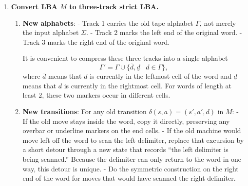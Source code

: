 \begin{enumerate}[{11.}1. ]
On input $x$ of length $n$, tape 1 holds $x$ and is never altered. Tape 2 starts
with just the start symbol $Z$. The finite control nondeterministically chooses
a production from $P$ and a position in the current sentential form on tape 2,
checks whether the left side of that production occurs at that position, and if
so replaces that occurrence by the right side by shifting the surrounding tape
contents as needed.

The only extra observation needed for a type~1 grammar is that, once the machine
has begun deriving a nonempty word, the length of the sentential form can never
decrease. Therefore any branch on which tape 2 ever becomes longer than $n$ can
be abandoned immediately, because it can never later shrink back to the target
word $x$. Thus every surviving computation keeps tape 2 within $n$ cells.

If $x=\lambda$, the only successful derivation is the special initial production
$Z\to\lambda$. If $x\neq\lambda$, the machine accepts exactly when some sequence
of guessed productions makes tape 2 agree with tape 1. Thus this two-tape
construction is bounded by a linear amount of tape, and hence is a
nondeterministic LBA.
Therefore every type~1 language is a LBL. \qed

\item \textbf{Convert LBA $M$ to three-track strict LBA.}

\begin{enumerate}
\item \textbf{New alphabets}:
- Track 1 carries the old tape alphabet $\Gamma$, not merely the input alphabet
$\Sigma$.
- Track 2 marks the left end of the original word.
- Track 3 marks the right end of the original word.

It is convenient to compress these three tracks into a single alphabet
\[
\Gamma'=\Gamma\cup\{\overline{d},\underline{d}\mid d\in\Gamma\},
\]
where $\overline{d}$ means that $d$ is currently in the leftmost cell of the
word and $\underline{d}$ means that $d$ is currently in the rightmost cell. For
words of length at least $2$, these two markers occur in different cells.

\item \textbf{New transitions}: For any old transition $\delta(s,a) = (s',a',d)$ in $M$:
  - If the old move stays inside the word, copy it directly, preserving any
  overbar or underline markers on the end cells.
  - If the old machine would move left off the word to scan the left delimiter,
  replace that excursion by a short detour through a new state that records
  ``the left delimiter is being scanned.'' Because the delimiter can only return
  to the word in one way, this detour is unique.
  - Do the symmetric construction on the right end of the word for moves that
  would have scanned the right delimiter.


\end{enumerate}
\end{enumerate}
